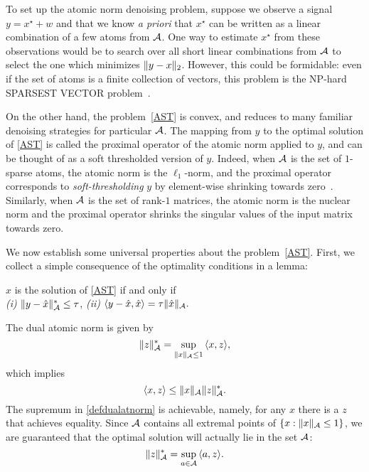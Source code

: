 To set up the atomic norm denoising problem, suppose we observe a signal $y =
x^\star + w$ and that we know \emph{a priori} that $x^\star$ can be written as
a linear combination of a few atoms from $\mathcal{A}$. One way to estimate $x^\star$
from these observations would be to search over all short linear combinations
from $\mathcal{A}$ to select the one which minimizes $\lVert y- x\rVert_2$. However,
this could be formidable: even if the set of atoms is a finite collection of
vectors, this problem is the NP-hard SPARSEST VECTOR
problem~\cite{Natarajan95}.

On the other hand, the problem~\eqref{AST} is convex, and reduces to many
familiar denoising strategies for particular $\mathcal{A}$. The mapping from $y$ to the
optimal solution of \eqref{AST} is called the proximal operator of the atomic
norm applied to $y$, and can be thought of as a soft thresholded version of
$y$. Indeed, when $\mathcal{A}$ is the set of $1$-sparse atoms, the atomic norm is the
$\ell_1$-norm, and the proximal operator corresponds to
\emph{soft-thresholding} $y$ by element-wise shrinking towards
zero~\cite{donoho1995noising}. Similarly, when $\mathcal{A}$ is the set of rank-$1$
matrices, the atomic norm is the nuclear norm and the proximal operator shrinks
the singular values of the input matrix towards zero.

We now establish some universal properties about the problem~\eqref{AST}.
First, we collect a simple consequence of the optimality conditions in a lemma:

\begin{lemma}
\label{lem:optimality-conditions}
$\hat{x}$ is the solution of \eqref{AST} if and only if\\
\emph{(i)}  $\lVert y - \hat{x}\rVert_{\mathcal{A}}^* \leq \tau$,
\emph{(ii)} $\langle y - \hat{x}, \hat{x}\rangle = \tau \lVert\hat{x}\rVert_{\mathcal{A}}.$
\end{lemma}

The dual atomic norm is given by
\begin{equation}
  \label{defdualatnorm}
  \lVert z\rVert_{\mathcal{A}}^* = \sup_{\lVert x\rVert_{\mathcal{A}} \leq 1}{\langle x, z\rangle},
\end{equation}
which implies
\begin{equation}
  \label{holder}
  \langle x, z\rangle \leq \lVert x\rVert_{\mathcal{A}} \lVert z\rVert_{\mathcal{A}}^*.
\end{equation}
The supremum in \eqref{defdualatnorm} is achievable, namely, for any $x$ there is a
$z$ that achieves equality. Since $\mathcal{A}$ contains all extremal points of
$\{x: \|x\|_{\mathcal{A}} \leq 1\}$, we are guaranteed that the optimal solution will actually lie in the set
$\mathcal{A}$:
\begin{equation}
\lVert z\rVert_{\mathcal{A}}^* = \sup_{a \in \mathcal{A}}{\langle a, z\rangle}.\label{bonsall}
\end{equation}

